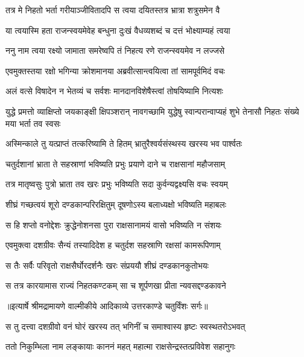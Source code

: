 \twolineshloka
{तत्र मे निहतो भर्ता गरीयाञ्जीवितादपि}
{स त्वया दयितस्तत्र भ्रात्रा शत्रुसमेन वै} %

\twolineshloka
{या त्वयास्मि हता राजन्स्वयमेवेह बन्धुना}
{दुःखं वैधव्यशब्दं च दत्तं भोक्ष्याम्यहं त्वया} %

\twolineshloka
{ननु नाम त्वया रक्ष्यो जामाता समरेष्वपि}
{तं निहत्य रणे राजन्स्वयमेव न लज्जसे} %

\twolineshloka
{एवमुक्तस्तया रक्षो भगिन्या क्रोशमानया}
{अब्रवीत्सान्त्वयित्वा तां सामपूर्वमिदं वचः} %

\twolineshloka
{अलं वत्से विषादेन न भेतव्यं च सर्वशः}
{मानदानविशेषैस्त्वां तोषयिष्यामि नित्यशः} %

\threelineshloka
{युद्धे प्रमत्तो व्याक्षिप्तो जयकाङ्क्षी क्षिपञ्शरान्}
{नावगच्छामि युद्धेषु स्वान्परान्वाप्यहं शुभे}
{तेनासौ निहतः संख्ये मया भर्ता तव स्वसः} %

\twolineshloka
{अस्मिन्काले तु यत्प्राप्तं तत्करिष्यामि ते हितम्}
{भ्रातुरैश्वर्यसंस्थस्य खरस्य भव पार्श्वतः} %

\twolineshloka
{चतुर्दशानां भ्राता ते सहस्राणां भविष्यति}
{प्रभुः प्रयाणे दाने च राक्षसानां महौजसाम्} %

\twolineshloka
{तत्र मातृष्वसुः पुत्रो भ्राता तव खरः प्रभुः}
{भविष्यति सदा कुर्वन्यद्वक्ष्यसि वचः स्वयम्} %

\twolineshloka
{शीघ्रं गच्छत्वयं शूरो दण्डकान्परिरक्षितुम्}
{दूषणोऽस्य बलाध्यक्षो भविष्यति महाबलः} %

\twolineshloka
{स हि शप्तो वनोद्देशः क्रुद्धेनोशनसा पुरा}
{राक्षसानामयं वासो भविष्यति न संशयः} %

\twolineshloka
{एवमुक्त्वा दशग्रीवः सैन्यं तस्यादिदेश ह}
{चतुर्दश सहस्राणि रक्षसां कामरूपिणाम्} %

\twolineshloka
{स तैः सर्वैः परिवृतो राक्षसैर्घोरदर्शनैः}
{खरः संप्रययौ शीघ्रं दण्डकानकुतोभयः} %

\twolineshloka
{स तत्र कारयामास राज्यं निहतकण्टकम्}
{सा च शूर्पणखा प्रीता न्यवसद्दण्डकावने} %


{॥इत्यार्षे श्रीमद्रामायणे वाल्मीकीये आदिकाव्ये उत्तरकाण्डे चतुर्विंशः सर्गः॥}


\twolineshloka
{स तु दत्त्वा दशग्रीवो वनं घोरं खरस्य तत्}
{भगिनीं च समाश्वास्य हृष्टः स्वस्थतरोऽभवत्} %

\twolineshloka
{ततो निकुम्भिला नाम लङ्कायाः काननं महत्}
{महात्मा राक्षसेन्द्रस्तत्प्रविवेश सहानुगः} %

